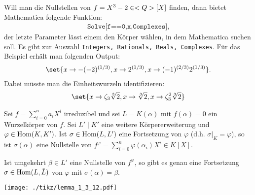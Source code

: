 \begin{mathematica}
	Will man die Nullstellen von $f = X^3 - 2 \in <Q>[X]$ finden, dann bietet Mathematica folgende Funktion:
	\begin{align*}
		\texttt{Solve[f==0,x,Complexes]},
	\end{align*}
	der letzte Parameter lässt einem den Körper wählen, in dem Mathematica suchen soll. Es gibt zur Auswahl \texttt{Integers, Rationals, Reals, Complexes}. Für das Beispiel erhält man folgenden Output:
	\begin{align*}
		\set{x \to -(-2)^{(1/3)}, x \to 2^{(1/3)}, x \to (-1)^{(2/3)} 2^{(1/3)}}.
	\end{align*}
	Dabei müsste man die Einheitswurzeln identifizieren:
	\begin{align*}
		\set{x \to \zeta_3\sqrt[3]{2}, x \to \sqrt[3]{2}, x \to \zeta_3^2 \sqrt[3]{2}}
	\end{align*}
\end{mathematica}
\begin{lemma}
	Sei $f = \sum_{i=0}^n a_i X^i$ irreduzibel und sei $L = K(\alpha)$ mit $f(\alpha)=0$ ein Wurzelkörper von $f$. Sei $L'\mid K'$ eine weitere Körpererweiterung und $\varphi \in \operatorname{Hom}(K,K')$. Ist $\sigma \in \operatorname{Hom}(L,L')$ eine Fortsetzung von $\varphi$ (d.h. $\sigma|_{K} = \varphi$), so ist $\sigma(\alpha)$ eine Nullstelle von $f^{\varphi}=\sum_{i=0}^n \varphi(\alpha_i)X^i \in K[X]$.
	
	Ist umgekehrt $\beta \in L' $ eine Nullstelle von $f^{\varphi}$, so gibt es genau eine Fortsetzung $\sigma \in \operatorname{Hom}(L,\tilde{L})$ von $\varphi$ mit $\sigma(\alpha) = \beta$.
\begin{center} %
	\texttt{[image: ./tikz/lemma\_1\_3\_12.pdf]}
\end{center}
\end{lemma}
